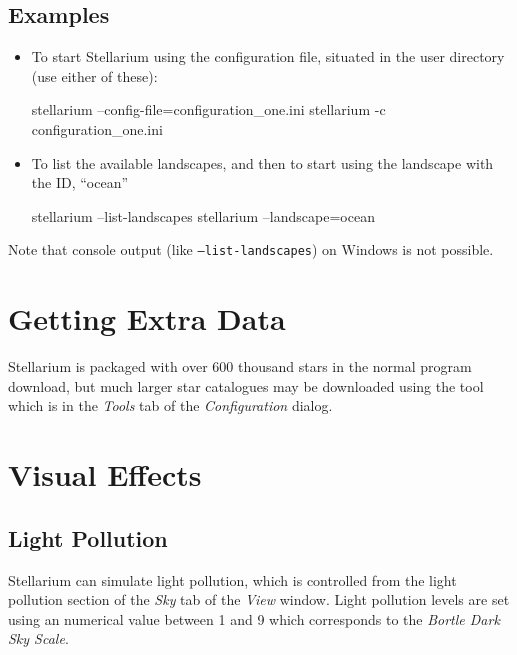 \section{Examples}\label{examples}
\label{sec:CommandLineOptions:Examples}

\begin{itemize}
\item To start Stellarium using the configuration file,
   situated in the user directory (use either of
  these):

\begin{commands}
stellarium --config-file=configuration_one.ini
stellarium -c configuration_one.ini
\end{commands}

\item To list the available landscapes, and then to start using the
  landscape with the ID, ``ocean''
\begin{commands}
stellarium --list-landscapes 
stellarium --landscape=ocean
\end{commands}
\end{itemize}

\noindent Note that console output (like \texttt{--list-landscapes}) on Windows is not possible. 

\chapter{Getting Extra Data}\label{getting-extra-star-data}

Stellarium is packaged with over 600 thousand stars in the normal
program download, but much larger star catalogues may be downloaded
using the tool which is in the \emph{Tools} tab of the
\emph{Configuration} dialog.

\chapter{Visual Effects}\label{visual-effects}

\section{Light Pollution}\label{light-pollution}

Stellarium can simulate light pollution, which is controlled from the
light pollution section of the \emph{Sky} tab of the \emph{View} window.
Light pollution levels are set using an numerical value between 1 and 9
which corresponds to the \emph{Bortle Dark Sky Scale}.


